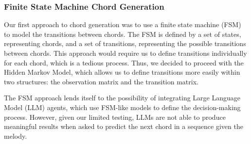 \subsubsection{Finite State Machine Chord Generation}

Our first approach to chord generation was to use a finite state machine (FSM) to model the transitions between chords. The FSM is defined by a set of states, representing chords, and a set of transitions, representing the possible transitions between chords. This approach would require us to define transitions individually for each chord, which is a tedious process. Thus, we decided to proceed with the Hidden Markov Model, which allows us to define transitions more easily within two structures: the observation matrix and the transition matrix.

The FSM approach lends itself to the possibility of integrating Large Language Model (LLM) agents, which use FSM-like models to define the decision-making process. However, given our limited testing, LLMs are not able to produce meaningful results when asked to predict the next chord in a sequence given the melody.
